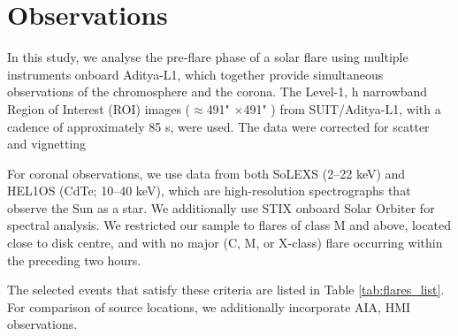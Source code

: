 \documentclass[fleqn,usenatbib]{mnras}
\begin{document}
\section{Observations}

In this study, we analyse the pre-flare phase of a solar flare using multiple instruments onboard Aditya-L1, which together provide simultaneous observations of the chromosphere and the corona.
The Level-1,  h narrowband Region of Interest (ROI) images ($\approx$491" $\times$491" ) from SUIT/Aditya-L1, with a cadence of approximately 85 s, were used. The data were corrected for scatter and vignetting

For coronal observations, we use data from both SoLEXS (2–22 keV) and HEL1OS (CdTe; 10–40 keV), which are high-resolution spectrographs that observe the Sun as a star.
We additionally use STIX onboard Solar Orbiter for spectral analysis.
We restricted our sample to flares of class M and above, located close to disk centre, and with no major (C, M, or X-class) flare occurring within the preceding two hours.

The selected events that satisfy these criteria are listed in Table \ref{tab:flares_list}.
For comparison of source locations, we additionally incorporate AIA, HMI observations.


\begin{table}
    \centering
    \caption{Flare cases being studied, the flare class, start time and peak time are based on the GOES flare catalogue}
    \label{tab:flares_list}
\end{table}
\end{document}
